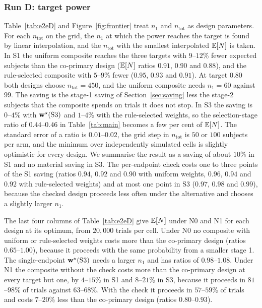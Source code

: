 \begin{table}
\centering\footnotesize
\caption{Run D: the pair $(n_1,n_{\mathrm{tot}})$ with the smallest $\E[N]$ at each target power ($\rho=0.3$), with $\E[N]$ at the design alternative, under N0 and under N1 and its ratio to the co-primary design (standard errors in parentheses).}\label{tab:e2eD}

\end{table}

\subsubsection{Run D: target power}
Table~\ref{tab:e2eD} and Figure~\ref{fig:frontier} treat $n_1$ and $n_{\mathrm{tot}}$ as design parameters. For each $n_{\mathrm{tot}}$ on the grid, the $n_1$ at which the power reaches the target is found by linear interpolation, and the $n_{\mathrm{tot}}$ with the smallest interpolated $\E[N]$ is taken. In S1 the uniform composite reaches the three targets with $9$--$12$\% fewer expected subjects than the co-primary design ($\E[N]$ ratios $0.91$, $0.90$ and $0.88$), and the rule-selected composite with $5$--$9$\% fewer ($0.95$, $0.93$ and $0.91$). At target $0.80$ both designs choose $n_{\mathrm{tot}}=450$, and the uniform composite needs $n_1=60$ against $99$. The saving is the stage-1 saving of Section~\ref{sec:saving} less the stage-2 subjects that the composite spends on trials it does not stop. In S3 the saving is $0$--$4$\% with $\mathbf{w}^\star(\mathrm{S3})$ and $1$--$4$\% with the rule-selected weights, so the selection-stage ratio of $0.44$--$0.46$ in Table~\ref{tab:main} becomes a few per cent of $\E[N]$. The standard error of a ratio is $0.01$--$0.02$, the grid step in $n_{\mathrm{tot}}$ is $50$ or $100$ subjects per arm, and the minimum over independently simulated cells is slightly optimistic for every design. We summarise the result as a saving of about $10$\% in S1 and no material saving in S3. The per-endpoint check costs one to three points of the S1 saving (ratios $0.94$, $0.92$ and $0.90$ with uniform weights, $0.96$, $0.94$ and $0.92$ with rule-selected weights) and at most one point in S3 ($0.97$, $0.98$ and $0.99$), because the checked design proceeds less often under the alternative and chooses a slightly larger $n_1$.

The last four columns of Table~\ref{tab:e2eD} give $\E[N]$ under N0 and N1 for each design at its optimum, from $20{,}000$ trials per cell. Under N0 no composite with uniform or rule-selected weights costs more than the co-primary design (ratios $0.65$--$1.00$), because it proceeds with the same probability from a smaller stage 1. The single-endpoint $\mathbf{w}^\star(\mathrm{S3})$ needs a larger $n_1$ and has ratios of $0.98$--$1.08$. Under N1 the composite without the check costs more than the co-primary design at every target but one, by $4$--$15$\% in S1 and $8$--$21$\% in S3, because it proceeds in $81$--$98$\% of trials against $63$--$68$\%. With the check it proceeds in $57$--$59$\% of trials and costs $7$--$20$\% less than the co-primary design (ratios $0.80$--$0.93$).

